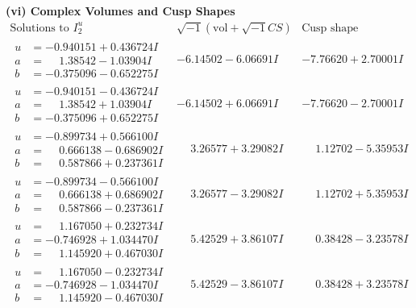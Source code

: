 \documentclass[1p]{elsarticle_modified}
\theoremstyle{definition}
\newcommand{\I}{\sqrt{-1}}
\begin{document}
\newpage\flushleft \textbf{(vi) Complex Volumes and Cusp Shapes}
$$\begin{array}{c|c|c}  
\text{Solutions to }I^u_{2}& \I (\text{vol} + \sqrt{-1}CS) & \text{Cusp shape}\\
 \hline 
\begin{aligned}
u &= -0.940151 + 0.436724 I \\
a &= \phantom{-}1.38542 - 1.03904 I \\
b &= -0.375096 - 0.652275 I\end{aligned}
 & -6.14502 - 6.06691 I & -7.76620 + 2.70001 I \\ \hline\begin{aligned}
u &= -0.940151 - 0.436724 I \\
a &= \phantom{-}1.38542 + 1.03904 I \\
b &= -0.375096 + 0.652275 I\end{aligned}
 & -6.14502 + 6.06691 I & -7.76620 - 2.70001 I \\ \hline\begin{aligned}
u &= -0.899734 + 0.566100 I \\
a &= \phantom{-}0.666138 - 0.686902 I \\
b &= \phantom{-}0.587866 + 0.237361 I\end{aligned}
 & \phantom{-}3.26577 + 3.29082 I & \phantom{-}1.12702 - 5.35953 I \\ \hline\begin{aligned}
u &= -0.899734 - 0.566100 I \\
a &= \phantom{-}0.666138 + 0.686902 I \\
b &= \phantom{-}0.587866 - 0.237361 I\end{aligned}
 & \phantom{-}3.26577 - 3.29082 I & \phantom{-}1.12702 + 5.35953 I \\ \hline\begin{aligned}
u &= \phantom{-}1.167050 + 0.232734 I \\
a &= -0.746928 + 1.034470 I \\
b &= \phantom{-}1.145920 + 0.467030 I\end{aligned}
 & \phantom{-}5.42529 + 3.86107 I & \phantom{-}0.38428 - 3.23578 I \\ \hline\begin{aligned}
u &= \phantom{-}1.167050 - 0.232734 I \\
a &= -0.746928 - 1.034470 I \\
b &= \phantom{-}1.145920 - 0.467030 I\end{aligned}
 & \phantom{-}5.42529 - 3.86107 I & \phantom{-}0.38428 + 3.23578 I \\ \hline\begin{aligned}

\end{aligned}
\end{array}$$
\end{document}
